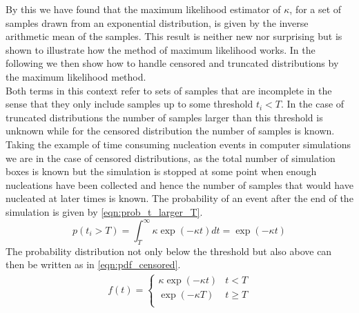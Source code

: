 By this we have found that the maximum likelihood estimator of $\kappa$, for a set of samples drawn from an exponential distribution, is given by the inverse arithmetic mean of the samples. This result is neither new nor surprising but is shown to illustrate how the method of maximum likelihood works. In the following we then show how to handle censored and truncated distributions by the maximum likelihood method.\\
Both terms in this context refer to sets of samples that are incomplete in the sense that they only include samples up to some threshold $t_i < T$. In the case of truncated distributions the number of samples larger than this threshold is unknown while for the censored distribution the number of samples is known. Taking the example of time consuming nucleation events in computer simulations we are in the case of censored distributions, as the total number of simulation boxes is known but the simulation is stopped at some point when enough nucleations have been collected and hence the number of samples that would have nucleated at later times is known. The probability of an event after the end of the simulation is given by \autoref{eqn:prob_t_larger_T}.
\begin{equation}
\label{eqn:prob_t_larger_T}
p(t_i>T) = \int_T^{\infty} \kappa \exp(-\kappa t) dt = \exp(-\kappa t) 
\end{equation}
The probability distribution not only below the threshold but also above can then be written as in \autoref{eqn:pdf_censored}.
\begin{align}
\label{eqn:pdf_censored}
f(t) = 
\begin{cases}
\kappa \exp(-\kappa t) & t < T\\
\exp(-\kappa T) & t \geq T\\ 
\end{cases}
\end{align}


